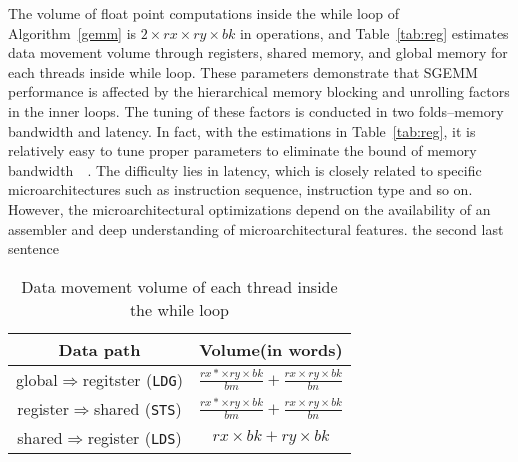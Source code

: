The volume of float point computations inside the while loop of Algorithm~\ref{gemm} is $2\times rx\times ry \times bk$ 
in operations, and Table~\ref{tab:reg} estimates data movement volume through registers, shared memory, and global 
memory for each threads inside while loop.
These parameters demonstrate that SGEMM performance is affected by the hierarchical memory blocking and unrolling 
factors in the inner loops.
The tuning of these factors is conducted in two folds--memory bandwidth and latency. In fact, with the estimations in 
Table~\ref{tab:reg}, it is relatively easy to tune proper parameters to eliminate the bound of memory 
bandwidth~\cite{magma}~\cite{tan}. The difficulty lies in latency, which is closely related to specific 
microarchitectures such as instruction sequence, instruction type and so on. However, the microarchitectural 
optimizations depend on the availability of an assembler and deep understanding of microarchitectural features. %
the second last sentence

\begin{table}[!t]
\caption{Data movement volume of each thread inside the while loop }
\centering
\scalebox{1.0} {
\begin{tabular}{|c|c|}
\hline
    Data path& Volume(in words)\\
\hline
    global$\Rightarrow$regitster ({\tt LDG})& $\frac{rx*\times ry \times bk}{bm} + \frac{rx\times ry \times bk}{bn}$ \\
\hline
register$\Rightarrow$shared ({\tt STS})& $\frac{rx*\times ry \times bk}{bm} + \frac{rx\times ry \times bk}{bn}$ \\
\hline
shared$\Rightarrow$register ({\tt LDS})& $rx\times bk + ry\times bk$\\
\hline
\end{tabular}
}
\label{tab:dm}
\end{table}
